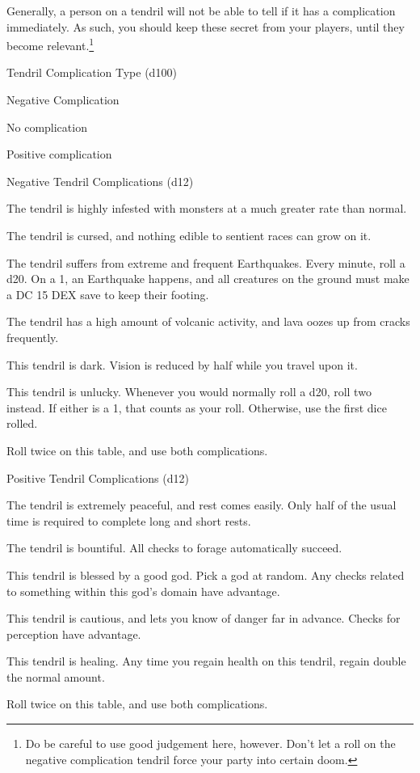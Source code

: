 \begin{multicols*}{2}
Generally, a person on a tendril will not be able to tell if it has a complication immediately.
As such, you should keep these secret from your players, until they become relevant.\footnote{Do be careful to use good judgement here, however. Don't let a roll on the negative complication tendril force your party into certain doom.}

\begin{rolltable}{Tendril Complication Type (d100)}
\item[1-3] Negative Complication
\item[4-97] No complication
\item[98-100] Positive complication
\end{rolltable}


\begin{rolltable}{Negative Tendril Complications (d12)}
\item[1-2] The tendril is highly infested with monsters at a much greater rate than normal.
\item[3-4] The tendril is cursed, and nothing edible to sentient races can grow on it.
\item[5-6] The tendril suffers from extreme and frequent Earthquakes.
Every minute, roll a d20.
On a 1, an Earthquake happens, and all creatures on the ground must make a DC 15 DEX save to keep their footing.
\item[7-8] The tendril has a high amount of volcanic activity, and lava oozes up from cracks frequently.
\item[9-10] This tendril is dark.
Vision is reduced by half while you travel upon it.
\item[11] This tendril is unlucky.
Whenever you would normally roll a d20, roll two instead.
If either is a 1, that counts as your roll.
Otherwise, use the first dice rolled.
\item[12] Roll twice on this table, and use both complications.
\end{rolltable}


\begin{rolltable}{Positive Tendril Complications (d12)}
\item[1-2] The tendril is extremely peaceful, and rest comes easily.
Only half of the usual time is required to complete long and short rests.
\item[3-4] The tendril is bountiful.
All checks to forage automatically succeed.
\item[5-6] This tendril is blessed by a good god.
Pick a god at random.
Any checks related to something within this god's domain have advantage.
\item[7-8] This tendril is cautious, and lets you know of danger far in advance.
Checks for perception have advantage.
\item[9-10] This tendril is healing.
Any time you regain health on this tendril, regain double the normal amount.
\item[12] Roll twice on this table, and use both complications.

\end{rolltable}

\end{multicols*}